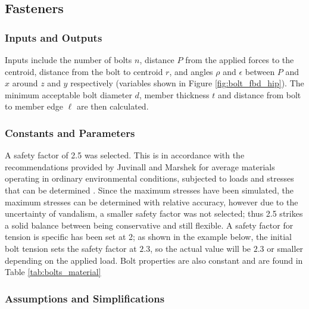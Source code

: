 \subsection{Fasteners} \label{subsec:bolt_analysis}


\subsubsection{Inputs and Outputs}

Inputs include the number of bolts $n$, distance $P$ from the applied forces to the centroid, distance from the bolt to centroid $r$, and angles $\rho$ and $\epsilon$ between $P$ and $x$ around $z$ and $y$ respectively (variables shown in Figure \ref{fig:bolt_fbd_hip}).
The minimum acceptable bolt diameter $d$, member thickness $t$ and distance from bolt to member edge $\ell$ are then calculated.


\subsubsection{Constants and Parameters}

A safety factor of 2.5 was selected.
This is in accordance with the recommendations provided by Juvinall and Marshek for average materials operating in ordinary environmental conditions, subjected to loads and stresses that can be determined \cite{juvinall_fundamentals_2012}.
Since the maximum stresses have been simulated, the maximum stresses can be determined with relative accuracy, however due to the uncertainty of vandalism, a smaller safety factor was not selected; thus 2.5 strikes a solid balance between being conservative and still flexible.
A safety factor for tension is specific has been set at 2; as shown in the example below, the initial bolt tension sets the safety factor at $2.3$, so the actual value will be $2.3$ or smaller depending on the applied load.
Bolt properties are also constant and are found in Table \ref{tab:bolts_material}


\subsubsection{Assumptions and Simplifications}


